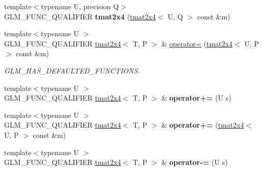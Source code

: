 \begin{DoxyCompactItemize}
\item 
\mbox{\label{structglm_1_1tmat2x4_af1c270415a38eaf9a9d62ebf1e5b5ce4}} 
{\footnotesize template$<$typename U, precision Q$>$ }\\G\+L\+M\+\_\+\+F\+U\+N\+C\+\_\+\+Q\+U\+A\+L\+I\+F\+I\+ER {\bfseries tmat2x4} (\hyperlink{structglm_1_1tmat2x4}{tmat2x4}$<$ U, Q $>$ const \&m)
\item 
\mbox{\label{structglm_1_1tmat2x4_abc6565efeca20fb615abcc146b78efa2}} 
{\footnotesize template$<$typename U $>$ }\\G\+L\+M\+\_\+\+F\+U\+N\+C\+\_\+\+Q\+U\+A\+L\+I\+F\+I\+ER \hyperlink{structglm_1_1tmat2x4}{tmat2x4}$<$ T, P $>$ \& \hyperlink{structglm_1_1tmat2x4_abc6565efeca20fb615abcc146b78efa2}{operator=} (\hyperlink{structglm_1_1tmat2x4}{tmat2x4}$<$ U, P $>$ const \&m)
\begin{DoxyCompactList}\small\item\em G\+L\+M\+\_\+\+H\+A\+S\+\_\+\+D\+E\+F\+A\+U\+L\+T\+E\+D\+\_\+\+F\+U\+N\+C\+T\+I\+O\+NS. \end{DoxyCompactList}\item 
\mbox{\label{structglm_1_1tmat2x4_a9acecf4bd516667aff87e24d998abdbe}} 
{\footnotesize template$<$typename U $>$ }\\G\+L\+M\+\_\+\+F\+U\+N\+C\+\_\+\+Q\+U\+A\+L\+I\+F\+I\+ER \hyperlink{structglm_1_1tmat2x4}{tmat2x4}$<$ T, P $>$ \& {\bfseries operator+=} (U s)
\item 
\mbox{\label{structglm_1_1tmat2x4_aba7049b76997321c5966fcfb72d2655d}} 
{\footnotesize template$<$typename U $>$ }\\G\+L\+M\+\_\+\+F\+U\+N\+C\+\_\+\+Q\+U\+A\+L\+I\+F\+I\+ER \hyperlink{structglm_1_1tmat2x4}{tmat2x4}$<$ T, P $>$ \& {\bfseries operator+=} (\hyperlink{structglm_1_1tmat2x4}{tmat2x4}$<$ U, P $>$ const \&m)
\item 
\mbox{\label{structglm_1_1tmat2x4_affe8a407491e92988ba4e27c7971013b}} 
{\footnotesize template$<$typename U $>$ }\\G\+L\+M\+\_\+\+F\+U\+N\+C\+\_\+\+Q\+U\+A\+L\+I\+F\+I\+ER \hyperlink{structglm_1_1tmat2x4}{tmat2x4}$<$ T, P $>$ \& {\bfseries operator-\/=} (U s)
\item 
\mbox{\label{structglm_1_1tmat2x4_a2413a5e38ef62a695afd3625b576f8a4}} 

\end{DoxyCompactItemize}
